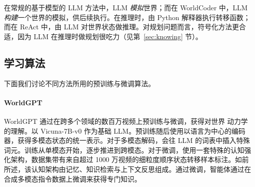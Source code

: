 在常规的基于模型的 LLM 方法中，LLM {\em 模拟}世界；而在 WorldCoder 中，LLM {\em 构建}一个世界的模拟，供后续执行。在推理时，由 Python 解释器执行转移函数；而在 ReAct 中，由 LLM 对世界状态做推理。对规划问题而言，符号化方法更合适，因为 LLM 在推理时做规划很吃力（见第~\ref{sec:knowing} 节）。

\subsection{学习算法}
下面我们讨论不同方法所用的预训练与微调算法。%

\paragraph{WorldGPT}
WorldGPT 通过在跨多个领域的数百万视频上预训练与微调，获得对世界
动力学的理解。以 Vicuna-7B-v0 作为基础 LLM。预训练随后使用以语言为中心的编码器，获得多模态状态的统一表示。对于多模态解码，会往 LLM 的词表中插入特殊词元。训练从单模态开始，逐步推进到跨模态。对于微调，使用一套特殊的认知强化架构，数据集带有来自超过 1000 万视频的细粒度顺序状态转移样本标注。如前所述，该认知架构由记忆、知识检索与上下文反思组成。通过微调，智能体通过在合成多模态指令数据上微调来获得专门知识。%

